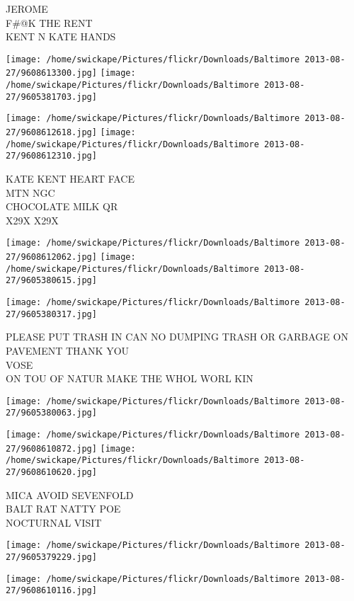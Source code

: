 \documentclass[10pt,letterpaper]{article}
\begin{document}
JEROME\\
F\#@K THE RENT\\
KENT N KATE HANDS
\pagebreak

\texttt{[image: /home/swickape/Pictures/flickr/Downloads/Baltimore 2013-08-27/9608613300.jpg]}
\texttt{[image: /home/swickape/Pictures/flickr/Downloads/Baltimore 2013-08-27/9605381703.jpg]}

\texttt{[image: /home/swickape/Pictures/flickr/Downloads/Baltimore 2013-08-27/9608612618.jpg]}
\texttt{[image: /home/swickape/Pictures/flickr/Downloads/Baltimore 2013-08-27/9608612310.jpg]}

KATE KENT HEART FACE\\
MTN NGC\\
CHOCOLATE MILK QR\\
X29X X29X
\pagebreak

\texttt{[image: /home/swickape/Pictures/flickr/Downloads/Baltimore 2013-08-27/9608612062.jpg]}
\texttt{[image: /home/swickape/Pictures/flickr/Downloads/Baltimore 2013-08-27/9605380615.jpg]}

\texttt{[image: /home/swickape/Pictures/flickr/Downloads/Baltimore 2013-08-27/9605380317.jpg]}

PLEASE PUT TRASH IN CAN NO DUMPING TRASH OR GARBAGE ON PAVEMENT THANK YOU\\
VOSE\\
ON TOU OF NATUR MAKE THE WHOL WORL KIN
\pagebreak

\texttt{[image: /home/swickape/Pictures/flickr/Downloads/Baltimore 2013-08-27/9605380063.jpg]}

\vspace{0.25in}
\texttt{[image: /home/swickape/Pictures/flickr/Downloads/Baltimore 2013-08-27/9608610872.jpg]}
\texttt{[image: /home/swickape/Pictures/flickr/Downloads/Baltimore 2013-08-27/9608610620.jpg]}

MICA AVOID SEVENFOLD\\
BALT RAT NATTY POE\\
NOCTURNAL VISIT
\pagebreak

\texttt{[image: /home/swickape/Pictures/flickr/Downloads/Baltimore 2013-08-27/9605379229.jpg]}

\vspace{0.25in}
\texttt{[image: /home/swickape/Pictures/flickr/Downloads/Baltimore 2013-08-27/9608610116.jpg]}
\end{document}

